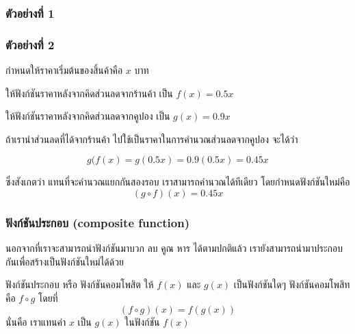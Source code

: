 \begin{frame}
\frametitle{ตัวอย่างที่ 1}
\end{frame}

\begin{frame}
\frametitle{ตัวอย่างที่ 2}
กำหนดให้ราคาเริ่มต้นของสิ้นค้าคือ $x$ บาท
\medskip

ให้ฟังก์ชันราคาหลังจากคิดส่วนลดจากร้านค้า เป็น $f(x) = 0.5 x$
\medskip

ให้ฟังก์ชันราคาหลังจากคิดส่วนลดจากคูปอง เป็น $g(x) = 0.9 x$
\medskip

ถ้าเรานำส่วนลดที่ได้จากร้านค้า ไปใช้เป็นราคาในการคำนวณส่วนลดจากคูปอง จะได้ว่า
\begin{slide}
\[g(f(x) = g(0.5 x) = 0.9 (0.5 x) = 0.45 x \]

ซึ่งสังเกตว่า แทนที่จะคำนวณแยกกันสองรอบ เราสามารถคำนวณได้ทีเดียว โดยกำหนดฟังก์ชันใหม่คือ
\[ (g \circ f)(x) = 0.45 x\]
\end{slide}
\end{frame}

\begin{frame}
\frametitle{ฟังก์ชันประกอบ (composite function)}
นอกจากที่เราจะสามารถนำฟังก์ชันมาบวก ลบ คูณ หาร ได้ตามปกติแล้ว \pa เรายังสามารถนำมาประกอบกันเพื่อสร้างเป็นฟังก์ชันใหม่ได้ด้วย
\begin{defn}{}{}
 ฟังก์ชันประกอบ หรือ ฟังก์ชันคอมโพสิต ให้ $f(x)$ และ $g(x)$  เป็นฟังก์ชันใดๆ \pa ฟังก์ชันคอมโพสิท คือ $f \circ g$  โดยที่ 
 \[ (f \circ g)(x)= f(g(x))\]
\pa นั่นคือ เราแทนค่า $x$ เป็น $g(x)$ ในฟังก์ชัน $f(x)$
\end{defn}
\end{frame}

